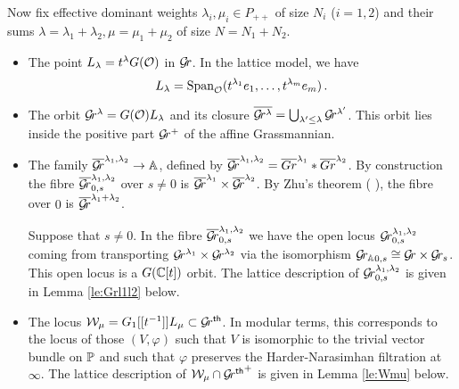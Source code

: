 \documentclass[draft]{article}
\begin{document}
Now fix effective dominant weights $ \lambda_i,\mu_i \in P_{++}$ of size $N_i$ ($i=1,2$) and their sums $ \lambda = \lambda_1 + \lambda_2, \mu = \mu_1 + \mu_2$ of size $ N = N_1 + N_2$.

% 
\begin{itemize}
    \item The point $L_\lambda = t^\lambda G(\mathcal O)$ in $\mathcal{G}\!r$. In the lattice model, we have
    $$ 
    L_\lambda = \operatorname{Span}_\mathcal O(t^{\lambda_1}e_1, \dots, t^{\lambda_m}e_m)\,. 
    $$
    \item The orbit $\mathcal{G}\!r^\lambda = G(\mathcal O) L_\lambda$ and its closure 
    $ \overline{\mathcal{G}\!r^\lambda} = \bigcup_{\lambda' \le \lambda} \mathcal{G}\!r^{\lambda'} $.  
    This orbit lies inside the positive part $ \mathcal{G}\!r^+$ of the affine Grassmannian.
    \item The family $ \overline{\mathcal{G}\!r}^{\lambda_1, \lambda_2} \rightarrow \mathbb A$, defined by $ \overline{\mathcal{G}\!r}^{\lambda_1, \lambda_2} = \overline{Gr}^{\lambda_1} * \overline{Gr}^{\lambda_2}$.  By construction the fibre $ \overline{\mathcal{G}\!r}_{0,s}^{\lambda_1, \lambda_2} $ over $ s \ne 0 $ is $ \overline{\mathcal{G}\!r}^{\lambda_1} \times \overline{\mathcal{G}\!r}^{\lambda_2}$.  By Zhu's theorem ( ), the fibre over $ 0 $ is $ \overline{\mathcal{G}\!r}^{\lambda_1 + \lambda_2}$.
    
    Suppose that $ s \ne 0$.  In the fibre $\overline{\mathcal{G}\!r}_{0,s}^{\lambda_1, \lambda_2}$ we have the open locus $ \mathcal{G}\!r_{0,s}^{\lambda_1, \lambda_2}$ coming from transporting $ \mathcal{G}\!r^{\lambda_1} \times \mathcal{G}\!r^{\lambda_2} $ via the isomorphism $ {\mathcal{G}\!r_{\mathbb A}}_{0,s} \cong \mathcal{G}\!r \times \mathcal{G}\!r_s $.  This open locus is a $ G(\mathbb C[t])$ orbit.  The lattice description of $ \mathcal{G}\!r_{0,s}^{\lambda_1, \lambda_2}$ is given in Lemma \ref{le:Grl1l2} below.
    
    \item The locus $\mathcal W_\mu = G_1[[t^{-1}]]L_\mu \subset {\mathcal{G}\!r^{\sf th}} $.  In modular terms, this corresponds to the locus of those $ (V, \varphi)$ such that $ V $ is isomorphic to the trivial vector bundle on $ \mathbb P$ and such that $ \varphi$ preserves the Harder-Narasimhan filtration at $ \infty$.  The lattice description of $ \mathcal W_\mu \cap {\mathcal{G}\!r^{\sf th}}^+$ is given in Lemma \ref{le:Wmu} below.
    

\end{itemize}
\end{document}
